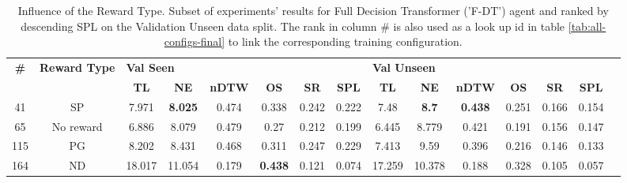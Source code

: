 \begin{table}
\centering
\caption{\label{tab:f_dt_reward_type}Influence of the Reward Type. Subset of experiments' results for Full Decision Transformer ('F-DT') agent and ranked by descending SPL on the Validation Unseen data split. The rank in column \# is also used as a look up id in table \ref{tab:all-configs-final} to link the corresponding training configuration.}
\begin{tabular}{@{\hskip3pt}c@{\hskip3pt}c@{\hskip3pt}c@{\hskip3pt}c@{\hskip3pt}c@{\hskip3pt}c@{\hskip3pt}c@{\hskip3pt}c@{\hskip3pt}c@{\hskip3pt}c@{\hskip3pt}c@{\hskip3pt}c@{\hskip3pt}c@{\hskip3pt}c@{\hskip3pt}c}
\toprule
\textbf{\#} & \textbf{Reward Type} & \multicolumn{6}{l}{\textbf{Val Seen}} & \multicolumn{6}{l}{\textbf{Val Unseen}} \\
 \textbf{~} &           \textbf{~} &       \textbf{TL} &     \textbf{NE} & \textbf{nDTW} &     \textbf{OS} & \textbf{SR} & \textbf{SPL} &         \textbf{TL} &   \textbf{NE} &   \textbf{nDTW} & \textbf{OS} & \textbf{SR} & \textbf{SPL} \\
\midrule
         41 &                   SP &             7.971 &  \textbf{8.025} &         0.474 &           0.338 &       0.242 &        0.222 &                7.48 &  \textbf{8.7} &  \textbf{0.438} &       0.251 &       0.166 &        0.154 \\
         65 &            No reward &             6.886 &           8.079 &         0.479 &            0.27 &       0.212 &        0.199 &               6.445 &         8.779 &           0.421 &       0.191 &       0.156 &        0.147 \\
        115 &                   PG &             8.202 &           8.431 &         0.468 &           0.311 &       0.247 &        0.229 &               7.413 &          9.59 &           0.396 &       0.216 &       0.146 &        0.133 \\
        164 &                   ND &            18.017 &          11.054 &         0.179 &  \textbf{0.438} &       0.121 &        0.074 &              17.259 &        10.378 &           0.188 &       0.328 &       0.105 &        0.057 \\
\bottomrule
\end{tabular}
\end{table}
